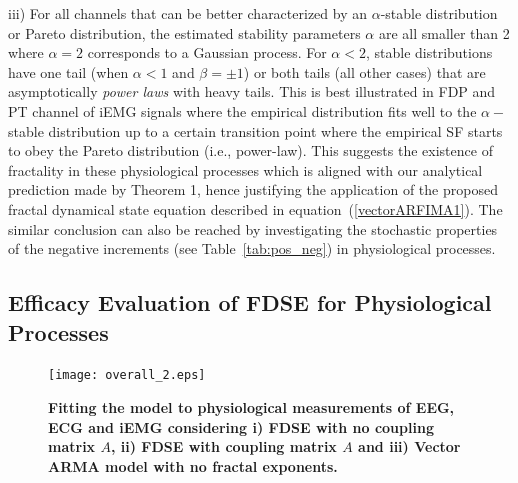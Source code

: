  iii) For all channels that can be better characterized by an $\alpha$-stable distribution or Pareto distribution, the estimated stability parameters $\alpha$ are all smaller than 2 where $\alpha=2$ corresponds to a Gaussian process. For $\alpha < 2$, stable distributions have one tail (when $\alpha < 1$ and $\beta = \pm 1$) or both tails (all other cases) that are asymptotically \textit{power laws} with heavy tails. This is best illustrated in FDP and PT channel of iEMG signals where the empirical distribution fits well to the $\alpha-$stable distribution up to a certain transition point where the empirical SF starts to obey the Pareto distribution (i.e., power-law). This suggests the existence of fractality in these physiological processes which is aligned with our analytical prediction made by Theorem 1, hence justifying the application of the proposed fractal dynamical state equation described in equation~(\ref{vectorARFIMA1}). The similar conclusion can also be reached by investigating the stochastic properties of the negative increments (see Table~\ref{tab:pos_neg}) in physiological processes.
\subsection{Efficacy Evaluation of FDSE for Physiological Processes}
\begin{figure}%
\centering
\texttt{[image: overall\_2.eps]}
\vskip -5mm
\caption{\textbf{Fitting the model to physiological measurements of EEG, ECG and iEMG considering i) FDSE with no coupling matrix $A$, ii) FDSE with coupling matrix $A$ and iii) Vector ARMA model with no fractal exponents.}}\label{fig:exp_result}
\vskip -4mm
\end{figure}  

